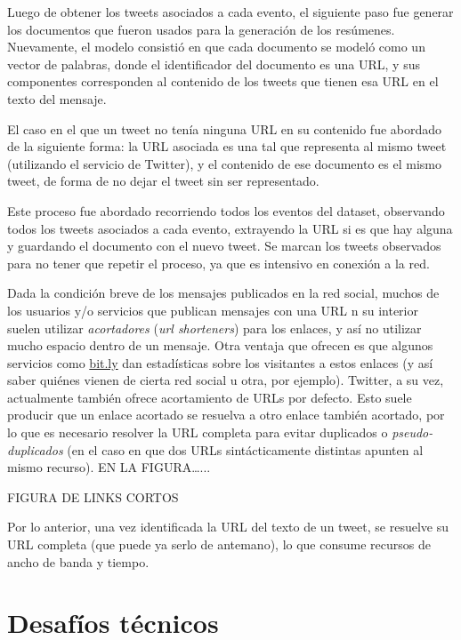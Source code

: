     Luego de obtener los tweets asociados a cada evento, el siguiente
    paso fue generar los documentos que fueron usados para la
    generación de los resúmenes. Nuevamente, el modelo consistió en que cada
    documento se modeló como un vector de palabras, donde el
    identificador del documento es una URL, y sus componentes
    corresponden al contenido de los tweets que tienen esa URL en el
    texto del mensaje.

    El caso en el que un tweet no tenía ninguna URL en su contenido
    fue abordado de la siguiente forma: la URL asociada es una tal que
    representa al mismo tweet (utilizando el servicio de Twitter), y
    el contenido de ese documento es el mismo tweet, de forma de no
    dejar el tweet sin ser representado.

    Este proceso fue abordado recorriendo todos los eventos del
    dataset, observando todos los tweets asociados a cada evento,
    extrayendo la URL si es que hay alguna y guardando el documento
    con el nuevo tweet. Se marcan los tweets observados para no tener
    que repetir el proceso, ya que es intensivo en conexión a la red.

    Dada la condición breve de los mensajes publicados en la red
    social, muchos de los usuarios y/o servicios que publican mensajes
    con una URL n su interior suelen utilizar \emph{acortadores} (\emph{url shorteners})
    para los enlaces, y así no utilizar mucho espacio dentro de un
    mensaje. Otra ventaja que ofrecen es que algunos servicios como
    \hyperref[sec-4.3.3]{bit.ly} dan estadísticas sobre los visitantes a estos enlaces (y
    así saber quiénes vienen de cierta red social u otra, por
    ejemplo). Twitter, a su vez, actualmente también ofrece
    acortamiento de URLs por defecto. Esto suele producir que un enlace
    acortado se resuelva a otro enlace también acortado, por lo que es
    necesario resolver la URL completa para evitar duplicados o
    \emph{pseudo-duplicados} (en el caso en que dos URLs sintácticamente
    distintas apunten al mismo recurso). EN LA FIGURA\ldots{}...

    FIGURA DE LINKS CORTOS

    Por lo anterior, una vez identificada la URL del texto de un
    tweet, se resuelve su URL completa (que puede ya serlo de
    antemano), lo que consume recursos de ancho de banda y
    tiempo.

\section{Desafíos técnicos}
\label{sec-4.4}

